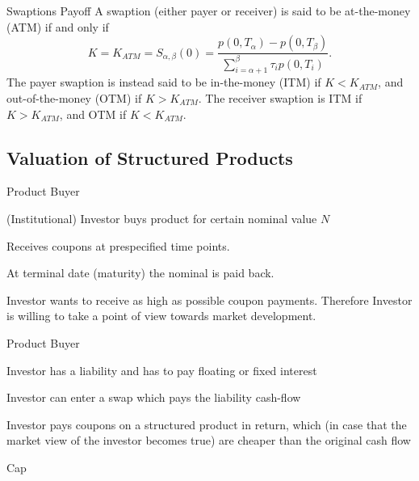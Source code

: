 
{Swaptions Payoff}
A swaption (either payer or receiver) is said to be at-the-money
(ATM) if and only if
$$
K=K_{ATM}=S_{\alpha,\beta}(0)=\frac{p(0,T_{\alpha})-p(0,T_{\beta})}{\sum_{i=\alpha+1}^{\beta}\tau_ip(0,T_i)}.
$$
The payer swaption is instead said to be in-the-money (ITM) if
$K<K_{ATM}$, and out-of-the-money (OTM) if $K>K_{ATM}$. The
receiver swaption is ITM if $K>K_{ATM}$, and OTM if $K<K_{ATM}$.

\subsection{Valuation of Structured Products}

{Product Buyer}


	(Institutional) Investor buys product for certain nominal value $N$

	Receives coupons at prespecified time points.

	At terminal date (maturity) the nominal is paid back.

	Investor wants to receive as high as possible coupon payments. Therefore Investor is willing to take a point of view towards market development.


{Product Buyer}


	Investor has a liability and has to pay floating or fixed interest

	Investor can enter a swap which pays the liability cash-flow

	Investor pays coupons on a structured product in return, which (in case that the market view of the investor becomes true) are cheaper than the original cash flow



{Cap}


